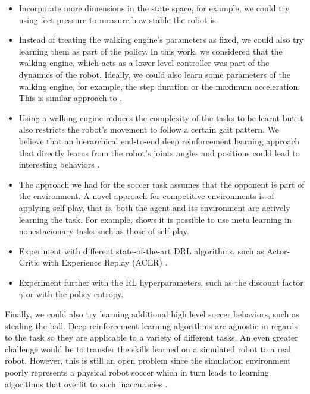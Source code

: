 \begin{itemize}
    \item Incorporate more dimensions in the state space, for example, we could try using 
    feet pressure to measure how stable the robot is.

    \item Instead of treating the walking engine's parameters as fixed, we could also try learning them as part of the policy.
    In this work, we considered that the walking engine, which acts as a lower level controller was part 
    of the dynamics of the robot. Ideally, we could also learn some parameters of the walking engine,
    for example, the step duration or the maximum acceleration.
    This is similar approach to .

    \item Using a walking engine reduces the complexity of the tasks to be learnt but it also 
    restricts the robot's movement to follow a certain gait pattern.
    We believe that an hierarchical end-to-end deep reinforcement learning approach that directly learns
    from the robot's joints angles and positions could lead to interesting behaviors \cite{MetaLearningSharedHiearchies}.

    \item The approach we had for the soccer task assumes that the opponent is part of the environment.
    A novel approach for competitive environments is of applying self play, that is, both the agent and 
    its environment are actively learning the task. For example, \cite{SelfPlayMetaLearning} shows it is possible to
    use meta learning in nonestacionary tasks such as those of self play.

    \item Experiment with different state-of-the-art DRL algorithms, such as Actor-Critic with Experience Replay (ACER) \cite{ACER}.

    \item Experiment further with the RL hyperparameters, such as the discount factor $\gamma$ or with the policy entropy.
\end{itemize}

Finally, we could also try learning additional high level soccer behaviors, such as stealing the ball.
Deep reinforcement learning algorithms are agnostic in regards to the task so they are applicable
to a variety of different tasks.
An even greater challenge would be to transfer the skills learned on a simulated robot to a real robot.
However, this is still an open problem since the simulation environment poorly represents a physical robot soccer 
which in turn leads to learning algorithms that overfit to such inaccuracies \cite{AAMAS13-Farchy}.
